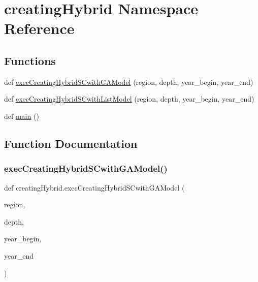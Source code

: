 \hypertarget{namespacecreating_hybrid}{}\section{creating\+Hybrid Namespace Reference}
\label{namespacecreating_hybrid}
\subsection*{Functions}
\begin{DoxyCompactItemize}
\item 
def \hyperlink{namespacecreating_hybrid_a972d794629c5e11adce0e01abcf7f5bd}{exec\+Creating\+Hybrid\+S\+Cwith\+G\+A\+Model} (region, depth, year\+\_\+begin, year\+\_\+end)
\item 
def \hyperlink{namespacecreating_hybrid_a494fec3281195003a2830c2ee78f63f5}{exec\+Creating\+Hybrid\+S\+Cwith\+List\+Model} (region, depth, year\+\_\+begin, year\+\_\+end)
\item 
def \hyperlink{namespacecreating_hybrid_af775563b0fc8f5b99a72d0d323956802}{main} ()
\end{DoxyCompactItemize}


\subsection{Function Documentation}
\mbox{\label{namespacecreating_hybrid_a972d794629c5e11adce0e01abcf7f5bd}} 
\subsubsection{\texorpdfstring{exec\+Creating\+Hybrid\+S\+Cwith\+G\+A\+Model()}{execCreatingHybridSCwithGAModel()}}
{\footnotesize\ttfamily def creating\+Hybrid.\+exec\+Creating\+Hybrid\+S\+Cwith\+G\+A\+Model (\begin{DoxyParamCaption}\item[{}]{region,  }\item[{}]{depth,  }\item[{}]{year\+\_\+begin,  }\item[{}]{year\+\_\+end }\end{DoxyParamCaption})}

